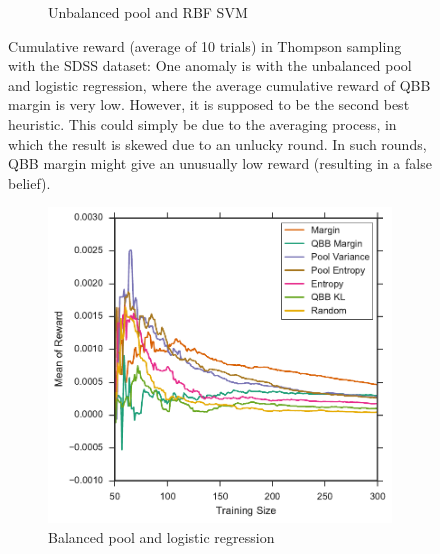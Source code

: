 \begin{figure}[p]
\begin{subfigure}{.5\textwidth}
		\caption{Unbalanced pool and RBF SVM}
		\label{fig:sdss_ur_sum_rewards}
	\end{subfigure}
	\caption[Cumulative reward of heuristics (SDSS)]{
		Cumulative reward (average of 10 trials) in Thompson sampling with the SDSS dataset: One anomaly is with the unbalanced pool and logistic regression, where the average cumulative reward of QBB margin is very low. However, it is supposed to be the second best heuristic. This could simply be due to the averaging process, in which the result is skewed due to an unlucky round. In such rounds, QBB margin might give an unusually low reward (resulting in a false belief).}
	\label{fig:sdss_sum_rewards}
\end{figure}


\begin{figure}[p]
	\centering
	\begin{subfigure}{.5\textwidth}
		\centering
		\includegraphics[width=\textwidth]{figures/5_thompson/sdss_bl_avg_rewards}
		\caption{Balanced pool and logistic regression}
		\label{fig:sdss_bl_avg_rewards}
	\end{subfigure}%
	\begin{subfigure}{.5\textwidth}
		\centering

\end{subfigure}
\end{figure}
